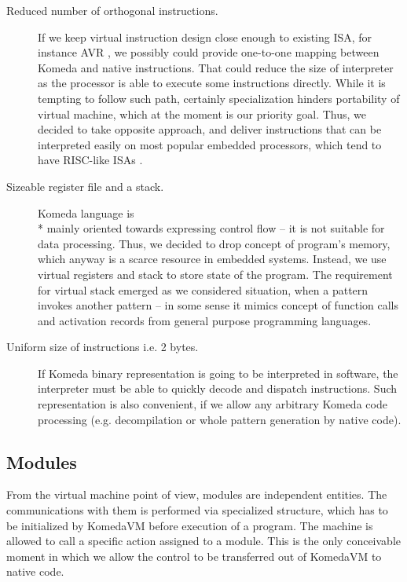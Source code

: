 \documentclass{article}
\begin{document}
\begin{description}
  \item[Reduced number of orthogonal instructions.]If we keep virtual instruction
    design close enough to existing ISA, for instance AVR \cite{avr}, we possibly
    could provide one-to-one mapping between Komeda and native instructions. That
    could reduce the size of interpreter as the processor is able to execute some
    instructions directly. While it is tempting to follow such path, certainly
    specialization hinders portability of virtual machine, which at the moment is
    our priority goal.  Thus, we decided to take opposite approach, and deliver
    instructions that can be interpreted easily on most popular embedded
    processors, which tend to have RISC-like ISAs \cite{risc}.

  \item[Sizeable register file and a stack.] Komeda language is \\* mainly
    oriented towards expressing control flow -- it is not suitable for data
    processing.  Thus, we decided to drop concept of program's memory, which
    anyway is a scarce resource in embedded systems.  Instead, we use virtual
    registers and stack to store state of the program. The requirement for
    virtual stack emerged as we considered situation, when a pattern invokes
    another pattern -- in some sense it mimics concept of function calls and
    activation records from general purpose programming languages.

  \item[Uniform size of instructions i.e. 2 bytes.] If Komeda binary
    representation is going to be interpreted in software, the interpreter must
    be able to quickly decode and dispatch instructions.  Such representation
    is also convenient, if we allow any arbitrary Komeda code processing (e.g.
    decompilation or whole pattern generation by native code).
\end{description}

\subsection{Modules}
From the virtual machine point of view, modules are independent entities. The
communications with them is performed via specialized structure, which has to
be initialized by KomedaVM before execution of a program.  The machine is
allowed to call a specific action assigned to a module.  This is the only
conceivable moment in which we allow the control to be transferred out of
KomedaVM to native code.
\end{document}
